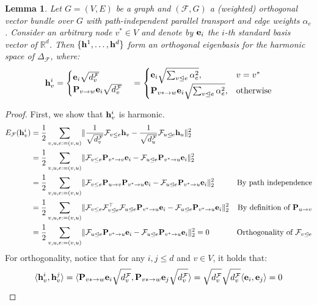 \documentclass{article}
\newtheorem{lemma}[theorem]{Lemma}
\def\ve{{\bf{e}}}
\def\vh{{\bf{h}}}
\def\mP{{\bf{P}}}
\def\gF{{\mathcal{F}}}
\def\sR{{\mathbb{R}}}
\newcommand{\tleq}{\trianglelefteq}
\DeclarePairedDelimiter{\norm}{\lVert}{\rVert}
\begin{document}
\begin{lemma}\label{lemma:orth_bundle_0eigenspace}
Let $G = (V, E)$ be a graph and $(\gF, G)$ a (weighted) orthogonal vector bundle over $G$ with path-independent parallel transport and edge weights $\alpha_e$. Consider an arbitrary node $v^* \in V$ and denote by $\ve_i$ the $i$-th standard basis vector of $\sR^d$. Then $\{ \vh^1,\ldots,\vh^d\}$ form an orthogonal eigenbasis for the harmonic space of $\Delta_\gF$, where:
\begin{equation}
    \vh^i_v = 
    \begin{cases}
        \ve_i \sqrt{d^\gF_v} \\
        \mP_{v \to w}\ve_i \sqrt{d^\gF_v}
    \end{cases}
    =
    \begin{cases}
        \ve_i \sqrt{\sum_{v \tleq e} \alpha_e^2}, & v = v^* \\
        \mP_{v* \to w}\ve_i \sqrt{\sum_{v \tleq e} \alpha_e^2}, & \text{otherwise}
    \end{cases}
\end{equation}
\end{lemma}

\begin{proof}
First, we show that $\vh^i_v$ is harmonic. 
\begin{align}
    E_\gF(\vh^i_v) &= \frac{1}{2} \sum_{v,u, e:=(v, u)} \norm{\frac{1}{\sqrt{d^\gF_v}}\gF_{v \leq e}\vh_v - \frac{1}{\sqrt{d^\gF_u}}\gF_{u \tleq e}\vh_u}_2^2 \\
    &= \frac{1}{2} \sum_{v,u, e:=(v, u)} \norm{\gF_{v \leq e}\mP_{v^* \to v}\ve_i - \gF_{u \tleq e}\mP_{v^* \to u}\ve_i}_2^2  \\
    &= \frac{1}{2} \sum_{v,u, e:=(v, u)} \norm{\gF_{v \leq e}\mP_{u \to v}\mP_{v^* \to u}\ve_i - \gF_{u \tleq e}\mP_{v^* \to u}\ve_i}_2^2 & \text{By path independence}  \\
    &= \frac{1}{2} \sum_{v,u, e:=(v, u)} \norm{\gF_{v \leq e}\gF_{v \tleq e}^\top\gF_{u \tleq e}\mP_{v^* \to u}\ve_i - \gF_{u \tleq e}\mP_{v^* \to u}\ve_i}_2^2 & \text{By definition of}\ \mP_{u \to v}  \\
    &= \frac{1}{2} \sum_{v,u, e:=(v, u)} \norm{\gF_{u \tleq e}\mP_{v^* \to u}\ve_i - \gF_{u \tleq e}\mP_{v^* \to u}\ve_i}_2^2 = 0 & \text{Orthogonality of}\ \gF_{v \tleq e} 
\end{align}
For orthogonality, notice that for any $i, j \leq d$ and $v \in V$, it holds that:
\begin{align}
    \langle \vh^i_v,  \vh^j_v \rangle = \langle \mP_{v* \to w}\ve_i \sqrt{d^\gF_v},  \mP_{v* \to w}\ve_j \sqrt{d^\gF_v} \rangle = \sqrt{d^\gF_v} \sqrt{d^\gF_v} \langle \ve_i, \ve_j \rangle = 0
\end{align}
\end{proof}
\end{document}

